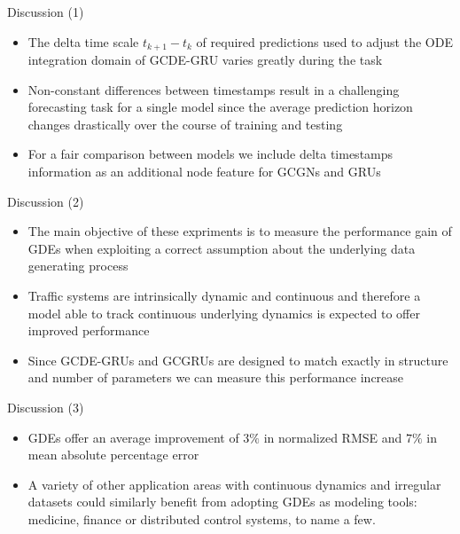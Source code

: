 \documentclass{beamer}
\begin{document}
\begin{frame}{Discussion (1)}
\begin{itemize}
\item The delta time scale $t_{k+1}-t_k$ of required predictions used to adjust the ODE integration domain of GCDE-GRU varies greatly during the task
\item Non-constant differences between timestamps result in a challenging forecasting task for a single model since the average prediction horizon changes drastically over the course of training and testing
\item For a fair comparison between models we include delta timestamps information as an additional node feature for GCGNs and GRUs
\end{itemize}
\end{frame}

\begin{frame}{Discussion (2)}
\begin{itemize}
\item The main objective of these expriments is to measure the performance gain of GDEs when exploiting a correct assumption about the underlying data generating process
\item Traffic systems are intrinsically dynamic and continuous and therefore a model able to track continuous underlying dynamics is expected to offer improved performance
\item Since GCDE-GRUs and GCGRUs are designed to match exactly in structure and number of parameters we can measure this performance increase
\end{itemize}
\end{frame}

\begin{frame}{Discussion (3)}
\begin{itemize}
\item GDEs offer an average improvement of $3\%$ in normalized RMSE and $7\%$ in mean absolute percentage error
\item A variety of other application areas with continuous dynamics and irregular datasets could similarly benefit from adopting GDEs as modeling tools: medicine, finance or distributed control systems, to name a few.
\end{itemize}
\end{frame}
\end{document}
